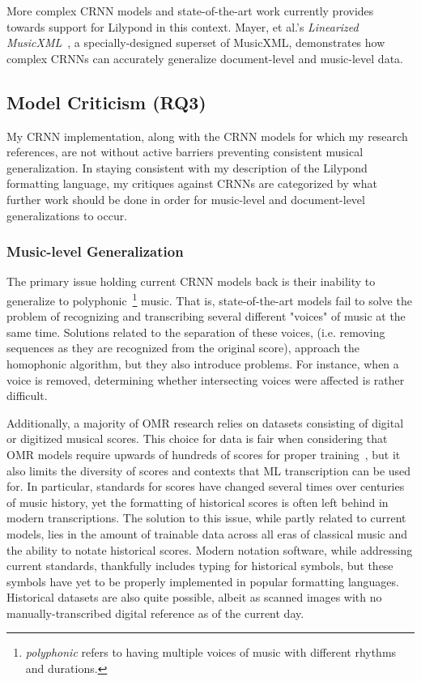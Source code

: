 \documentclass[nonacm, sigconf]{acmart}
\begin{document}
More complex CRNN models and state-of-the-art work currently provides towards support for Lilypond in this context.
Mayer, et al.'s \textit{Linearized MusicXML}~\cite{mayer2024practical}, a specially-designed superset of MusicXML, demonstrates how complex CRNNs can accurately generalize document-level and music-level data.


\subsection{Model Criticism (RQ3)}
My CRNN implementation, along with the CRNN models for which my research references, are not without active barriers preventing consistent musical generalization.
In staying consistent with my description of the Lilypond formatting language, my critiques against CRNNs are categorized by what further work should be done in order for music-level and document-level generalizations to occur.

\subsubsection{Music-level Generalization}
The primary issue holding current CRNN models back is their inability to generalize to polyphonic~\footnote{\textit{polyphonic} refers to having multiple voices of music with different rhythms and durations.} music.
That is, state-of-the-art models fail to solve the problem of recognizing and transcribing several different "voices" of music at the same time.
Solutions related to the separation of these voices, (i.e. removing sequences as they are recognized from the original score), approach the homophonic algorithm, but they also introduce problems.
For instance, when a voice is removed, determining whether intersecting voices were affected is rather difficult.

Additionally, a majority of OMR research relies on datasets consisting of digital or digitized musical scores.
This choice for data is fair when considering that OMR models require upwards of hundreds of scores for proper training~\cite{mayer2024practical}, but it also limits the diversity of scores and contexts that ML transcription can be used for.
In particular, standards for scores have changed several times over centuries of music history, yet the formatting of historical scores is often left behind in modern transcriptions.
The solution to this issue, while partly related to current models, lies in the amount of trainable data across all eras of classical music and the ability to notate historical scores.
Modern notation software, while addressing current standards, thankfully includes typing for historical symbols, but these symbols have yet to be properly implemented in popular formatting languages.
Historical datasets are also quite possible, albeit as scanned images with no manually-transcribed digital reference as of the current day.   
\end{document}
